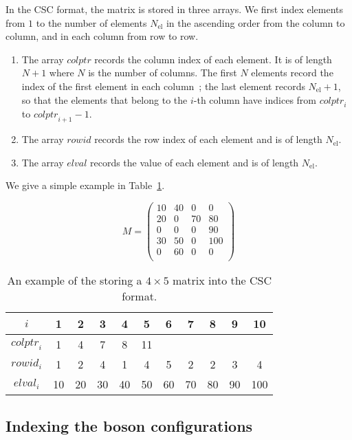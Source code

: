 \documentclass{timesjhep}
\begin{document}
In the CSC format, the matrix is stored in three arrays. We first index elements from $1$ to the number of elements $N_\textrm{el}$ in the ascending order from the column to column, and in each column from row to row.
\begin{enumerate}
    \item The array $\mathit{colptr}$ records the column index of each element. It is of length $N+1$ where $N$ is the number of columns. The first $N$ elements record the index of the first element in each column~; the last element records $N_\textrm{el}+1$, so that the elements that belong to the $i$-th column have indices from $\mathit{colptr}_i$ to $\mathit{colptr}_{i+1}-1$.
    \item The array $rowid$ records the row index of each element and is of length $N_\textrm{el}$.
    \item The array $\mathit{elval}$ records the value of each element and is of length $N_\textrm{el}$.
\end{enumerate}
We give a simple example in Table~\ref{tbl:csc_eg}.

\begin{table}[htbp]
    \centering
    \begin{equation*}
        M=\begin{pmatrix}
            10&40&0&0\\
            20&0&70&80\\
            0&0&0&90\\
            30&50&0&100\\
            0&60&0&0\\
        \end{pmatrix}
    \end{equation*}
    \begin{tabular}{c|cccccccccc}
        \hline\hline
        $i$&1&2&3&4&5&6&7&8&9&10\\
        \hline
        $\mathit{colptr}_i$&1&4&7&8&11\\
        $\mathit{rowid}_i$&1&2&4&1&4&5&2&2&3&4\\
        $\mathit{elval}_i$&10&20&30&40&50&60&70&80&90&100\\
        \hline\hline
    \end{tabular}
    \caption{An example of the storing a $4\times 5$ matrix into the CSC format. }
    \label{tbl:csc_eg}
\end{table}

\FloatBarrier

\subsection{Indexing the boson configurations}
\label{app:data_boson}
\end{document}
